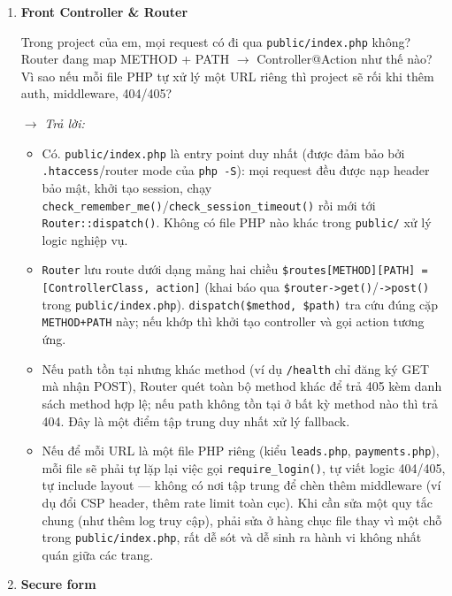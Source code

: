 \begin{enumerate}[label = \textbf{\arabic*.}, leftmargin=*]

    \item \textbf{Front Controller \& Router}

    Trong project của em, mọi request có đi qua \texttt{public/index.php} không? Router đang map METHOD + PATH $\rightarrow$ Controller@Action như thế nào? Vì sao nếu mỗi file PHP tự xử lý một URL riêng thì project sẽ rối khi thêm auth, middleware, 404/405?

    \hspace*{-0.6cm} $\rightarrow$ \textit{Trả lời:}

    \begin{itemize}[leftmargin = 0.55cm, label = $\bullet$]
        \item Có. \texttt{public/index.php} là entry point duy nhất (được đảm bảo bởi \texttt{.htaccess}/router mode của \texttt{php -S}): mọi request đều được nạp header bảo mật, khởi tạo session, chạy \texttt{check\_remember\_me()}/\texttt{check\_session\_timeout()} rồi mới tới \texttt{Router::dispatch()}. Không có file PHP nào khác trong \texttt{public/} xử lý logic nghiệp vụ.
        \item \texttt{Router} lưu route dưới dạng mảng hai chiều \texttt{\$routes[METHOD][PATH] = [ControllerClass, action]} (khai báo qua \texttt{\$router->get()}/\texttt{->post()} trong \texttt{public/index.php}). \texttt{dispatch(\$method, \$path)} tra cứu đúng cặp \texttt{METHOD+PATH} này; nếu khớp thì khởi tạo controller và gọi action tương ứng.
        \item Nếu path tồn tại nhưng khác method (ví dụ \texttt{/health} chỉ đăng ký GET mà nhận POST), Router quét toàn bộ method khác để trả 405 kèm danh sách method hợp lệ; nếu path không tồn tại ở bất kỳ method nào thì trả 404. Đây là một điểm tập trung duy nhất xử lý fallback.
        \item Nếu để mỗi URL là một file PHP riêng (kiểu \texttt{leads.php}, \texttt{payments.php}), mỗi file sẽ phải tự lặp lại việc gọi \texttt{require\_login()}, tự viết logic 404/405, tự include layout — không có nơi tập trung để chèn thêm middleware (ví dụ đổi CSP header, thêm rate limit toàn cục). Khi cần sửa một quy tắc chung (như thêm log truy cập), phải sửa ở hàng chục file thay vì một chỗ trong \texttt{public/index.php}, rất dễ sót và dễ sinh ra hành vi không nhất quán giữa các trang.
    \end{itemize}

    \item \textbf{Secure form}


\end{enumerate}
